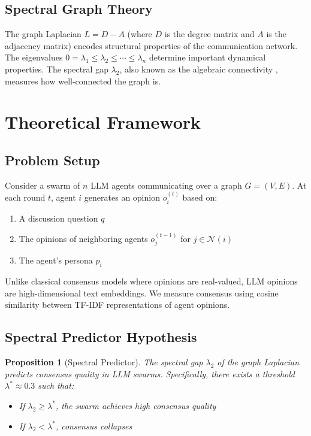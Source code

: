 \documentclass[10pt]{article}
\newtheorem{proposition}{Proposition}
\begin{document}
\subsection{Spectral Graph Theory}

The graph Laplacian \(L = D - A\) (where \(D\) is the degree matrix and \(A\) is the adjacency matrix) encodes structural properties of the communication network. The eigenvalues \(0 = \lambda_1 \leq \lambda_2 \leq \cdots \leq \lambda_n\) determine important dynamical properties. The spectral gap \(\lambda_2\), also known as the algebraic connectivity \citep{fiedler1973algebraic}, measures how well-connected the graph is.

\section{Theoretical Framework}

\subsection{Problem Setup}

Consider a swarm of \(n\) LLM agents communicating over a graph \(G = (V, E)\). At each round \(t\), agent \(i\) generates an opinion \(o_i^{(t)}\) based on:
\begin{enumerate}
    \item A discussion question \(q\)
    \item The opinions of neighboring agents \(o_j^{(t-1)}\) for \(j \in \mathcal{N}(i)\)
    \item The agent's persona \(p_i\)
\end{enumerate}

Unlike classical consensus models where opinions are real-valued, LLM opinions are high-dimensional text embeddings. We measure consensus using cosine similarity between TF-IDF representations of agent opinions.

\subsection{Spectral Predictor Hypothesis}

\begin{proposition}[Spectral Predictor]
The spectral gap \(\lambda_2\) of the graph Laplacian predicts consensus quality in LLM swarms. Specifically, there exists a threshold \(\lambda^* \approx 0.3\) such that:
\begin{itemize}
    \item If \(\lambda_2 \geq \lambda^*\), the swarm achieves high consensus quality
    \item If \(\lambda_2 < \lambda^*\), consensus collapses
\end{itemize}
\end{proposition}
\end{document}
